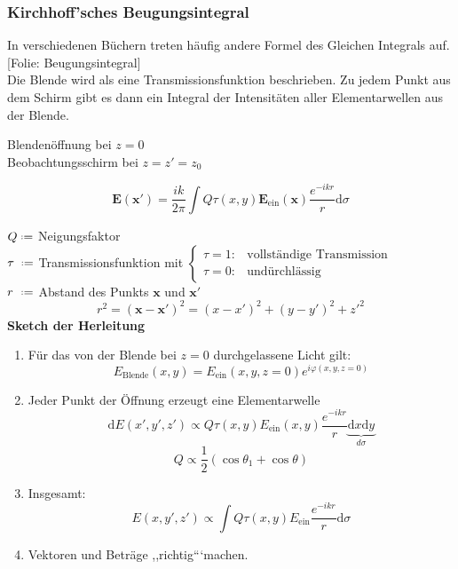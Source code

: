 \documentclass[titlepage,11pt,a4paper,ngerman]{report}
\newcommand*{\defeq}{\mathrel{\vcenter{\baselineskip0.5ex \lineskiplimit0pt \hbox{\scriptsize.}\hbox{\scriptsize.}}}=}
\newcommand{\tx}[1]{\textrm{#1}}
\newcommand{\ub}[1]{\underbrace{#1}}
\newcommand{\dd}{\tx{d}}
\newcommand{\folie}[1]{\color{gray}[Folie: #1]\color{black}}
\renewcommand{\vec}[1]{\boldsymbol{#1}}
\newcommand{\lcom}[1]{\color{MidnightBlue}#1\color{black}}
\newcommand{\frbox}[2]{\begin{tcolorbox}[colback=white,colframe=red!75!black,fonttitle=\bfseries,title=#1]#2\end{tcolorbox}}
\begin{document}
\subsubsection{Kirchhoff'sches Beugungsintegral}

\lcom{In verschiedenen Büchern treten häufig andere Formel des Gleichen Integrals auf.}\\
\folie{Beugungsintegral}\\
\lcom{Die Blende wird als eine Transmissionsfunktion beschrieben. Zu jedem Punkt aus dem Schirm gibt es dann ein Integral der Intensitäten aller Elementarwellen aus der Blende.}


\noindent
Blendenöffnung bei $ z = 0 $\\
Beobachtungsschirm bei $ z = z' = z_0 $
\frbox{Kirchhoff'sches Beugungsintegral}{
\begin{equation*}
\vec{E}(\vec{x}') = \frac{ik}{2 \pi} \int Q \tau(x,y) \vec{E}_{\tx{ein}} (\vec{x}) \frac{e^{-ikr}}{r} \dd \sigma 
\end{equation*}}
$ Q \defeq $ Neigungsfaktor\\
$ \tau \; \defeq $ Transmissionsfunktion mit $ \left\{ \begin{array}{ll}
\tau = 1 : & \tx{vollständige Transmission} \\ \tau = 0 : & \tx{undürchlässig}
\end{array} \right. $\\
$ r \ \defeq $ Abstand des Punkts $ \vec{x} $ und $ \vec{x}' $
\begin{equation*}
r^2 = (\vec{x} - \vec{x}')^2 = (x-x')^2 + (y-y')^2 + z'^2
\end{equation*}
\textbf{Sketch der Herleitung}
\begin{enumerate}[(1)]
	\item Für das von der Blende bei $ z = 0 $ durchgelassene Licht gilt:
	\begin{equation*}
	E_{\tx{Blende}} (x,y) = E_{\tx{ein}} (x,y,z=0) e^{i\varphi (x,y,z=0)}
	\end{equation*}
	\item Jeder Punkt der Öffnung erzeugt eine Elementarwelle
	\begin{equation*}
	\dd E(x',y',z') \propto Q \tau(x,y) E_{\tx{ein}} (x,y) \frac{e^{-ikr}}{r} \ub{\dd x \dd y}_{d\sigma}
	\end{equation*}
	\begin{equation*}
	Q \propto \frac{1}{2} (\cos \theta_1 + \cos \theta)
	\end{equation*}
	\item Insgesamt:
	\begin{equation*}
	E(x,y',z') \propto \int Q \tau(x,y) E_{\tx{ein}} \frac{e^{-ikr}}{r} \dd \sigma
	\end{equation*}
	\item  Vektoren und Beträge ,,richtig```machen.
\end{enumerate}
\end{document}
